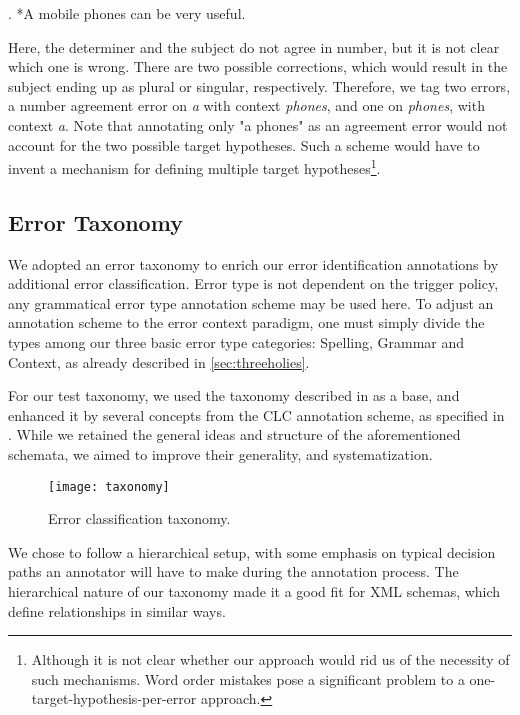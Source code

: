 \documentclass[12pt]{article}
\begin{document}
\ex. *A mobile phones can be very useful.

Here, the determiner and the subject do not agree in number, but it is not clear
which one is wrong. There are two possible corrections, which would result
in the subject ending up as plural or singular, respectively. Therefore, we tag
two errors, a number agreement error on \textit{a} with context \textit{phones}, and
one on \textit{phones}, with context \textit{a}. Note that annotating only "a
phones" as an agreement error would not account for the two possible target
hypotheses. Such a scheme would have to invent a mechanism for defining multiple
target hypotheses\footnote{Although it is not clear whether our approach would
rid us of the necessity of such mechanisms. Word order mistakes pose a
significant problem to a one-target-hypothesis-per-error approach.}.


\subsection{Error Taxonomy}
We adopted an error taxonomy to enrich our error identification annotations by
additional error classification. Error type is not dependent on the trigger
policy, any grammatical error type annotation scheme may be used here. To adjust
an annotation scheme to the error context paradigm, one must simply divide the
types among our three basic error type categories: Spelling, Grammar and
Context, as already described in \ref{sec:threeholies}.

For our test taxonomy, we used the taxonomy described in \cite{negrillo} as a
base, and enhanced it by several concepts from the CLC annotation scheme, as
specified in \cite{CLC}. While we retained the general ideas and structure of
the aforementioned schemata, we aimed to improve their generality, and
systematization.

\begin{figure}
\centering
\texttt{[image: taxonomy]}\label{fig:tax}
\caption{Error classification taxonomy.}
\end{figure}

We chose to follow a hierarchical setup, with some emphasis on typical decision
paths an annotator will have to make during the annotation process. The
hierarchical nature of our taxonomy made it a good fit for XML schemas, which
define relationships in similar ways.
\end{document}
